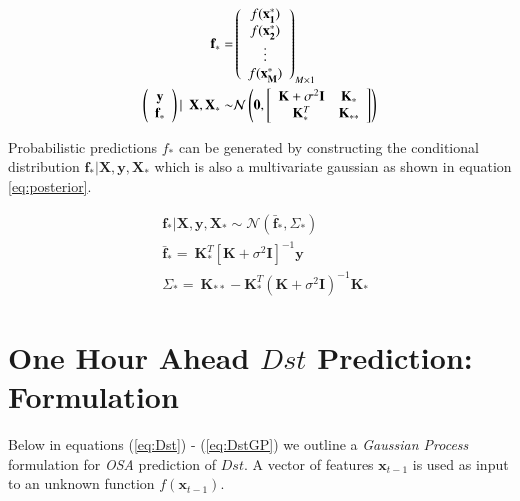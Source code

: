 \documentclass{article}
\begin{document}
\begin{align}
  \mathbf{f}_* = & \left( \begin{array}{c} f(\mathbf{x^{*}_1}) \\ f(\mathbf{x^{*}_2}) \\ \vdots \\ f(\mathbf{x^{*}_M}) \end{array} \right)_{M \times 1} \\
  \vspace{4\baselineskip}
  \left( \begin{array}{c} \mathbf{y} \\ \mathbf{f_*} \end{array} \right) | \ \ \mathbf{X}, \mathbf{X}_* \sim & 
                                                                                                               \mathcal{N}\left(\mathbf{0}, \left[ \begin{array}{cc} \mathbf{K} + \sigma^{2} \mathbf{I} & \mathbf{K}_{*} \\ \mathbf{K}_{*}^T & \mathbf{K}_{**} \end{array} \right ] \right) \label{eq:dist}
\end{align}

Probabilistic predictions $f_*$ can be generated by constructing the conditional distribution $\mathbf{f_*}|\mathbf{X},\mathbf{y},\mathbf{X_*}$ which is also a multivariate gaussian as shown in equation \ref{eq:posterior}.

\begin{align}
  & \mathbf{f_*}|\mathbf{X},\mathbf{y},\mathbf{X_*} \sim \mathcal{N}(\mathbf{\bar{f}_*}, \Sigma_*)  \label{eq:posterior} \\
  & \mathbf{\bar{f}_*} =  \ \mathbf{K}^T_{*} [\mathbf{K} + \sigma^{2} \mathbf{I}]^{-1} \mathbf{y} \label{eq:posteriormean} \\
  & \Sigma_* = \ \mathbf{K}_{**} - \mathbf{K}^T_{*} \left(\mathbf{K} + \sigma^{2} \mathbf{I}\right)^{-1} \mathbf{K}_{*} \label{eq:posteriorcov}
\end{align}

\section{One Hour Ahead $Dst$ Prediction: Formulation} \label{sec:osa}

Below in equations (\ref{eq:Dst}) - (\ref{eq:DstGP}) we outline a \emph{Gaussian Process} formulation for \emph{OSA} prediction of $Dst$. A vector of features $\mathbf{x}_{t-1}$ is used as input to an unknown function $f(\mathbf{x}_{t-1})$.
\end{document}
